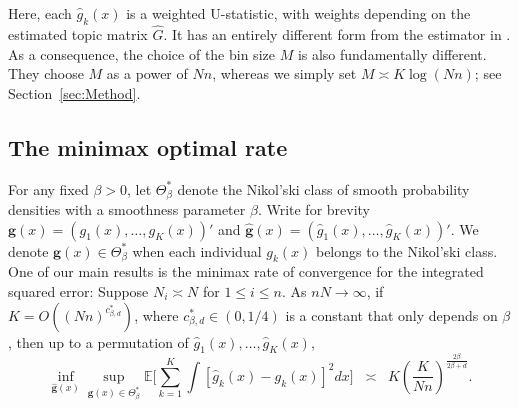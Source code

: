 \documentclass[preprint,11pt]{article}
\numberwithin{equation}{section}
\newcommand{\beq}{\begin{equation}}
\newcommand{\eeq}{\end{equation}}
\begin{document}
Here, each $\hat{g}_k(x)$ is a weighted U-statistic, with weights depending on the estimated topic matrix $\widehat{G}$. It has an entirely different form from the estimator in \cite{austern2025poisson}. 
As a consequence, the choice of the bin size $M$ is also fundamentally different.
They choose $M$ as a power of $Nn$, whereas we simply set $M\asymp K\log(Nn)$; 
see Section~\ref{sec:Method}. 

%


\subsection{The minimax optimal rate}
For any fixed $\beta>0$, let $\Theta^*_\beta$ denote the Nikol’ski class \citep{nikol2012approximation} of smooth probability densities with a smoothness parameter $\beta$. 
Write for brevity $\bm{g}(x)=(g_1(x), \ldots, g_K(x))'$ and $\widehat{\bm{g}}(x)=(\hat{g}_1(x), \ldots, \hat{g}_K(x))'$. We denote $\bm{g}(x)\in\Theta^*_\beta$ when each individual $g_k(x)$ belongs to the Nikol’ski class.  One of our main results is the minimax rate of convergence for the integrated squared error: Suppose $N_i\asymp N$ for $1\leq i\leq n$. As $n N\to \infty$, if $K=O((Nn)^{c^*_{\beta,d}})$, where $c^*_{\beta,d}\in (0,1/4)$ is a constant that only depends on $\beta$, then up to a permutation of $\hat{g}_1(x),\ldots,\hat{g}_K(x)$, 
 \beq \label{minimax}
\inf_{\widehat{\bm{g}}(x)} \sup_{\bm{g}(x)\in\Theta^*_\beta} \mathbb{E}\Biggl[\sum_{k=1}^K \int [\hat{g}_k(x)-g_k(x)]^2dx \Biggr]\;\; \asymp\;\; K\left(\frac{K}{N n}\right)^{\frac{2\beta}{2\beta+d}}. 
\eeq
\end{document}
